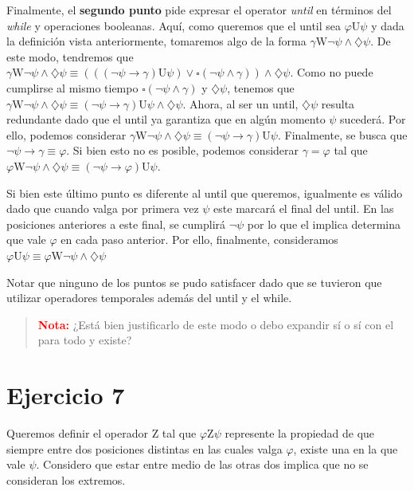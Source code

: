 \documentclass{article}
\begin{document}
Finalmente, el \textbf{segundo punto} pide expresar el operator \textit{until} en términos del \textit{while} y operaciones booleanas.
Aquí, como queremos que el until sea $\varphi \text{U} \psi$ y dada la definición vista anteriormente, tomaremos algo de la forma $\gamma \text{W} \neg\psi \land \diamondsuit\psi$.
De este modo, tendremos que $\gamma \text{W} \neg\psi \land \diamondsuit\psi \equiv (((\neg\psi \to \gamma) \text{U} \psi) \lor \square(\neg\psi \land \gamma)) \land \diamondsuit\psi$.
Como no puede cumplirse al mismo tiempo $\square(\neg\psi \land \gamma)$ y $\diamondsuit\psi$, tenemos que $\gamma \text{W} \neg\psi \land \diamondsuit\psi \equiv (\neg\psi \to \gamma) \text{U} \psi \land \diamondsuit\psi$.
Ahora, al ser un until, $\diamondsuit\psi$ resulta redundante dado que el until ya garantiza que en algún momento $\psi$ sucederá.
Por ello, podemos considerar $\gamma \text{W} \neg\psi \land \diamondsuit\psi \equiv (\neg\psi \to \gamma) \text{U} \psi$.
Finalmente, se busca que $\neg\psi \to \gamma \equiv \varphi$.
Si bien esto no es posible, podemos considerar $\gamma = \varphi$ tal que $\varphi \text{W} \neg\psi \land \diamondsuit\psi \equiv (\neg\psi \to \varphi) \text{U} \psi$.

Si bien este último punto es diferente al until que queremos, igualmente es válido dado que cuando valga por primera vez $\psi$ este marcará el final del until.
En las posiciones anteriores a este final, se cumplirá $\neg\psi$ por lo que el implica determina que vale $\varphi$ en cada paso anterior.
Por ello, finalmente, consideramos $\varphi \text{U} \psi \equiv \varphi \text{W} \neg\psi \land \diamondsuit\psi$

Notar que ninguno de los puntos se pudo satisfacer dado que se tuvieron que utilizar operadores temporales además del until y el while.

\begin{quotation}
	\textbf{\textcolor{Red}{Nota:}} ¿Está bien justificarlo de este modo o debo expandir sí o sí con el para todo y existe?
\end{quotation}

\section*{Ejercicio 7}
Queremos definir el operador $\text{Z}$ tal que $\varphi \text{Z} \psi$ represente la propiedad de que siempre entre dos posiciones distintas en las cuales valga $\varphi$, existe una en la que vale $\psi$.
Considero que estar entre medio de las otras dos implica que no se consideran los extremos.
\end{document}

